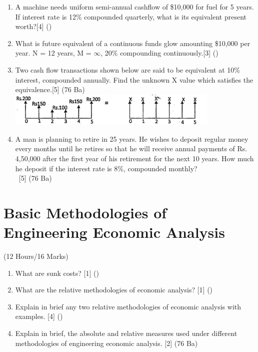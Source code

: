 \documentclass[12pt]{article}
\newcommand{\enter}{\\\textcolor{white}{1}}
\begin{document}
\begin{enumerate}
	\item A machine needs uniform semi-annual cashflow of \$10,000 for fuel for 5 years. If interest rate is 12\% compounded quarterly, what is its equivalent present worth?\hfill[4] ()

	\item What is future equivalent of a continuous funds glow amounting \$10,000 per year. N = 12 years, M = $\infty$, 20\% compounding continuously.\hfill[3] ()

	\item Two cash flow transactions shown below are said to be equivalent at 10\% interest, compounded annually. Find the unknown X value which satisfies the equivalence.\hspace{6mm}[5] (76 Ba)\\
	\includegraphics[width=4in]{ee_1}

	\item A man is planning to retire in 25 years. He wishes to deposit regular money every months until he retires so that he will receive annual payments of Rs. 4,50,000 after the first year of his retirement for the next 10 years. How much he deposit if the interest rate is 8\%, compounded monthly?
	\enter\hfill[5] (76 Ba)
	\end{enumerate}

	\pagebreak
\section{Basic Methodologies of Engineering Economic Analysis}
	\begin{center}(12 Hours/16 Marks)\end{center}
	\begin{enumerate}[noitemsep, topsep = 0pt]
		\item What are sunk costs? \hfill [1] ()
		
		\item What are the relative methodologies of economic analysis? \hfill [1] ()
		
		\item Explain in brief any two relative methodologies of economic analysis with examples. \hfill [4] ()
		
		\item Explain in brief, the absolute and relative measures used under different methodologies of engineering economic analysis. \hspace{10.4cm} [2] (76 Ba)
		
	\end{enumerate}
\end{document}
